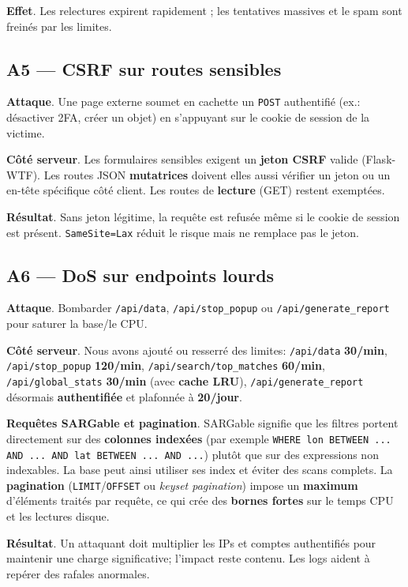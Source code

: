 \textbf{Effet}. Les relectures expirent rapidement ; les tentatives massives et le spam sont freinés par les limites.

 

\subsection*{A5 — CSRF sur routes sensibles}
\textbf{Attaque}. Une page externe soumet en cachette un \texttt{POST} authentifié (ex.: désactiver 2FA, créer un objet) en s'appuyant sur le cookie de session de la victime.

\textbf{Côté serveur}. Les formulaires sensibles exigent un \textbf{jeton CSRF} valide (Flask-WTF). Les routes JSON \textbf{mutatrices} doivent elles aussi vérifier un jeton ou un en-tête spécifique côté client. Les routes de \textbf{lecture} (GET) restent exemptées.

\textbf{Résultat}. Sans jeton légitime, la requête est refusée même si le cookie de session est présent. \texttt{SameSite=Lax} réduit le risque mais ne remplace pas le jeton.

\subsection*{A6 — DoS sur endpoints lourds}
\textbf{Attaque}. Bombarder \texttt{/api/data}, \texttt{/api/stop\_popup} ou \texttt{/api/generate\_report} pour saturer la base/le CPU.

\textbf{Côté serveur}. Nous avons ajouté ou resserré des limites: \texttt{/api/data} \textbf{30/min}, \texttt{/api/stop\_popup} \textbf{120/min}, \texttt{/api/search/top\_matches} \textbf{60/min}, \texttt{/api/global\_stats} \textbf{30/min} (avec \textbf{cache LRU}), \texttt{/api/generate\_report} désormais \textbf{authentifiée} et plafonnée à \textbf{20/jour}.

\noindent \textbf{Requêtes SARGable et pagination}. \og SARGable \fg{} signifie que les filtres portent directement sur des \textbf{colonnes indexées} (par exemple \texttt{WHERE lon BETWEEN ... AND ... AND lat BETWEEN ... AND ...}) plutôt que sur des expressions non indexables. La base peut ainsi utiliser ses index et éviter des scans complets. La \textbf{pagination} (\texttt{LIMIT}/\texttt{OFFSET} ou \emph{keyset pagination}) impose un \textbf{maximum} d'éléments traités par requête, ce qui crée des \textbf{bornes fortes} sur le temps CPU et les lectures disque.

\textbf{Résultat}. Un attaquant doit multiplier les IPs et comptes authentifiés pour maintenir une charge significative; l'impact reste contenu. Les logs aident à repérer des rafales anormales.

